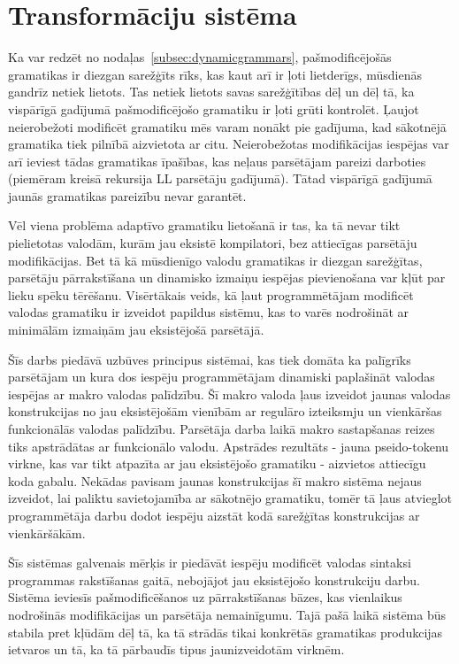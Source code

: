 \section{Transformāciju sistēma}
Ka var redzēt no nodaļas~\ref{subsec:dynamicgrammars}, pašmodificējošās gramatikas ir diezgan sarežģīts rīks, kas kaut arī ir ļoti lietderīgs, mūsdienās gandrīz netiek lietots. Tas netiek lietots savas sarežģītības dēļ un dēļ tā, ka vispārīgā gadījumā pašmodificējošo gramatiku ir ļoti grūti kontrolēt. Ļaujot neierobežoti modificēt gramatiku mēs varam nonākt pie gadījuma, kad sākotnējā gramatika tiek pilnībā aizvietota ar citu. Neierobežotas modifikācijas iespējas var arī ieviest tādas gramatikas īpašības, kas neļaus parsētājam pareizi darboties (piemēram kreisā rekursija LL parsētāju gadījumā). Tātad vispārīgā gadījumā jaunās gramatikas pareizību nevar garantēt.

Vēl viena problēma adaptīvo gramatiku lietošanā ir tas, ka tā nevar tikt pielietotas valodām, kurām jau eksistē kompilatori, bez attiecīgas parsētāju modifikācijas. Bet tā kā mūsdienīgo valodu gramatikas ir diezgan sarežģītas, parsētāju pārrakstīšana un dinamisko izmaiņu iespējas pievienošana var kļūt par lieku spēku tērēšanu. Visērtākais veids, kā ļaut programmētājam modificēt valodas gramatiku ir izveidot papildus sistēmu, kas to varēs nodrošināt ar minimālām izmaiņām jau eksistējošā parsētājā.

Šīs darbs piedāvā uzbūves principus sistēmai, kas tiek domāta ka palīgrīks parsētājam un kura dos iespēju programmētājam dinamiski paplašināt valodas iespējas ar makro valodas palīdzību. Šī makro valoda ļaus izveidot jaunas valodas konstrukcijas no jau eksistējošām vienībām ar regulāro izteiksmju un vienkāršas funkcionālās valodas palīdzību. Parsētāja darba laikā makro sastapšanas reizes tiks apstrādātas ar funkcionālo valodu. Apstrādes rezultāts - jauna pseido-tokenu virkne, kas var tikt atpazīta ar jau eksistējošo gramatiku - aizvietos attiecīgu koda gabalu. Nekādas pavisam jaunas konstrukcijas šī makro sistēma nejaus izveidot, lai paliktu savietojamība ar sākotnējo gramatiku, tomēr tā ļaus atvieglot programmētāja darbu dodot iespēju aizstāt kodā sarežģītas konstrukcijas ar vienkāršākām. 

Šīs sistēmas galvenais mērķis ir piedāvāt iespēju modificēt valodas sintaksi programmas rakstīšanas gaitā, nebojājot jau eksistējošo konstrukciju darbu. Sistēma ieviesīs pašmodificēšanos uz pārrakstīšanas bāzes, kas vienlaikus nodrošinās modifikācijas un parsētāja nemainīgumu. Tajā pašā laikā sistēma būs stabila pret kļūdām dēļ tā, ka tā strādās tikai konkrētās gramatikas produkcijas ietvaros un tā, ka tā pārbaudīs tipus jaunizveidotām virknēm.

